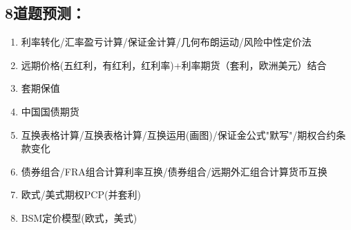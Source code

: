 \documentclass{article}
\begin{document}
\subsection{8道题预测：}
\begin{enumerate}
    \item 利率转化/汇率盈亏计算/保证金计算/几何布朗运动/风险中性定价法
    \item 远期价格(五红利，有红利，红利率)+利率期货（套利，欧洲美元）结合
    \item 套期保值
    \item 中国国债期货
    \item 互换表格计算/互换表格计算/互换运用(画图)/保证金公式"默写"/期权合约条款变化
    \item 债券组合/FRA组合计算利率互换/债券组合/远期外汇组合计算货币互换
    \item 欧式/美式期权PCP(并套利)
    \item BSM定价模型(欧式，美式)
\end{enumerate}

\clearpage
\end{document}
